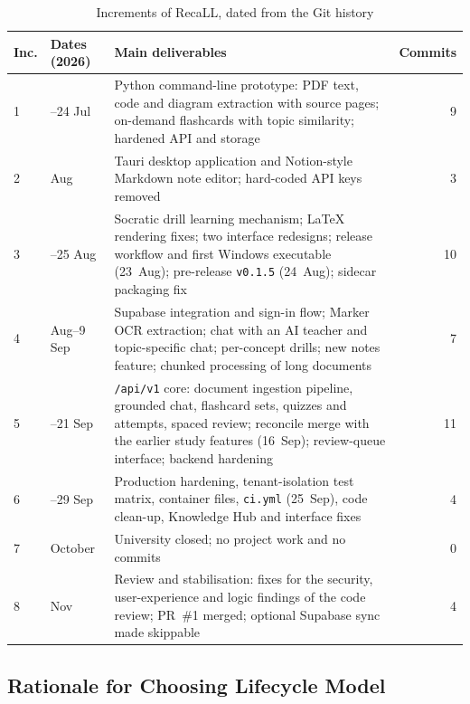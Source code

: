 \begin{table}[htbp]
\centering
\caption{Increments of RecaLL, dated from the Git history}\label{tab:increments}
\small
\begin{tabularx}{\textwidth}{@{}l >{\raggedright\arraybackslash}p{2.3cm} X r@{}}
\toprule
\textbf{Inc.} & \textbf{Dates (2026)} & \textbf{Main deliverables} & \textbf{Commits}\\
\midrule
1 & 22--24 Jul & Python command-line prototype: PDF text, code and diagram extraction with
source pages; on-demand flashcards with topic similarity; hardened API and storage & 9\\
2 & 5 Aug & Tauri desktop application and Notion-style Markdown note editor; hard-coded
API keys removed & 3\\
3 & 19--25 Aug & Socratic drill learning mechanism; LaTeX rendering fixes; two interface
redesigns; release workflow and first Windows executable (23~Aug); pre-release
\texttt{v0.1.5} (24~Aug); sidecar packaging fix & 10\\
4 & 26 Aug--9 Sep & Supabase integration and sign-in flow; Marker OCR extraction; chat with
an AI teacher and topic-specific chat; per-concept drills; new notes feature; chunked
processing of long documents & 7\\
5 & 12--21 Sep & \texttt{/api/v1} core: document ingestion pipeline, grounded chat,
flashcard sets, quizzes and attempts, spaced review; reconcile merge with the earlier study
features (16~Sep); review-queue interface; backend hardening & 11\\
6 & 25--29 Sep & Production hardening, tenant-isolation test matrix, container files,
\texttt{ci.yml} (25~Sep), code clean-up, Knowledge Hub and interface fixes & 4\\
7 & October & University closed; no project work and no commits & 0\\
8 & 5 Nov & Review and stabilisation: fixes for the security, user-experience and logic
findings of the code review; PR~\#1 merged; optional Supabase sync made skippable
& 4\\
\bottomrule
\end{tabularx}
\end{table}


\subsection{Rationale for Choosing Lifecycle Model}


